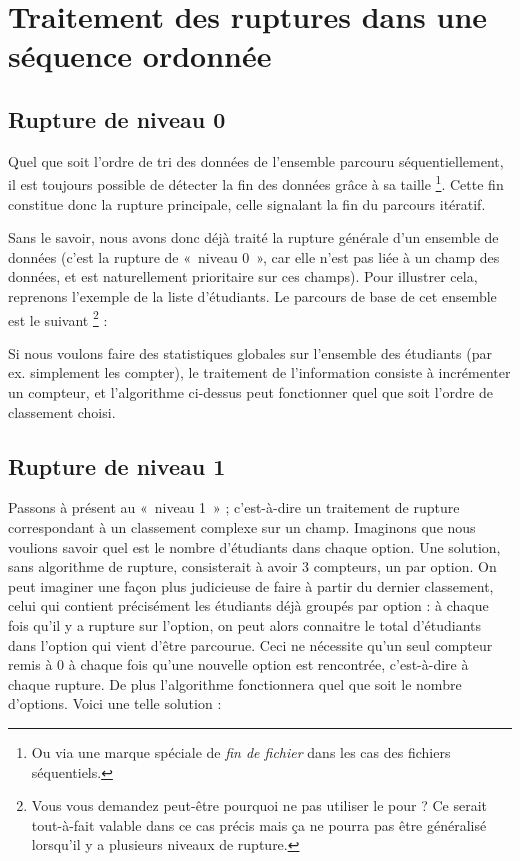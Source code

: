 \section{Traitement des ruptures dans une séquence ordonnée}

\subsection*{Rupture de niveau 0}

	Quel que soit l’ordre de tri des données de l'ensemble parcouru séquentiellement, 
	il est toujours possible de détecter la fin des données grâce à sa taille%
	\footnote{%
		Ou via une marque spéciale de \emph{fin de fichier}
		dans les cas des fichiers séquentiels.
	}.
	Cette \og{}fin\fg{} constitue donc la rupture principale, 
	celle signalant la fin du parcours itératif.
	
	Sans le savoir, nous avons donc déjà traité la rupture générale d’un
	ensemble de données (c’est la rupture de «~niveau 0~»,
	car elle n’est pas liée à un champ des données, 
	et est naturellement prioritaire sur ces champs). 
	Pour illustrer cela, reprenons l’exemple de la liste d’étudiants. 
	Le parcours de base de cet ensemble est le suivant%
	\footnote{%
		Vous vous demandez peut-être pourquoi ne pas utiliser le \og{}pour\fg{} ?
		Ce serait tout-à-fait valable dans ce cas précis mais ça ne pourra pas
		être généralisé lorsqu'il y a plusieurs niveaux de rupture.
	} :

	\begin{algo}
	\end{algo}

	Si nous voulons faire des statistiques globales sur l’ensemble des
	étudiants (par ex. simplement les compter), le traitement de
	l’information consiste à incrémenter un compteur, et l’algorithme
	ci-dessus peut fonctionner quel que soit l’ordre de classement choisi.

\subsection*{Rupture de niveau 1}

	Passons à présent au «~niveau 1~» ; c’est-à-dire un traitement de
	rupture correspondant à un classement complexe sur un champ. 
	Imaginons que nous voulions savoir quel est le nombre d’étudiants dans chaque option. 
	Une solution, sans algorithme de rupture, consisterait à avoir 3 compteurs, un par option.
	On peut imaginer une façon plus judicieuse de faire à partir du dernier classement, celui
	qui contient précisément les étudiants déjà groupés par option : 
	à chaque fois qu’il y a rupture sur l’option, 
	on peut alors connaitre le total d’étudiants dans l’option qui vient d’être parcourue. 
	Ceci ne nécessite qu’un seul compteur remis à 0 à chaque fois qu’une nouvelle
	option est rencontrée, c’est-à-dire à chaque rupture. 
	De plus l’algorithme fonctionnera quel que soit le nombre d’options. 
	Voici une telle solution : 

